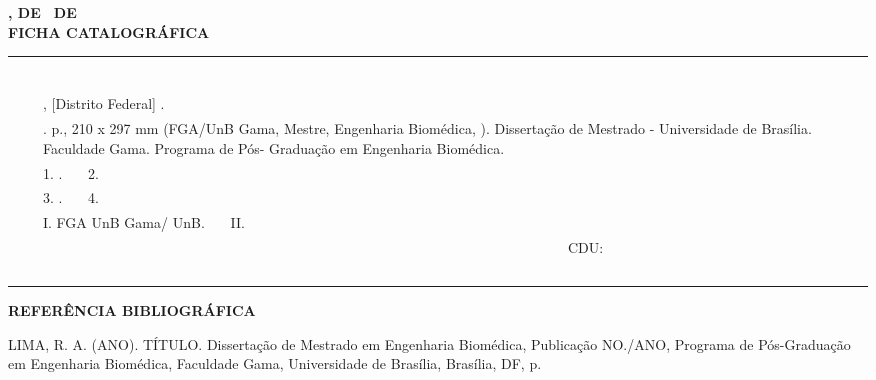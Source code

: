\begin{fichacatalografica}
\begin{flushleft}
    \textbf{\imprimirlocal, \imprimirdia DE \imprimirmes\, DE \imprimirdata} \\
       	    \vspace{0.25 in}
	\textbf{FICHA CATALOGRÁFICA}\\
	\begin{tabular}{c|p{}p{13.5cm}|}
	\multicolumn{3}{l}{~~~ } \\ \cline{2-3} 
	& & \\
	& & \imprimirautor \\
	& & \imprimirtitulo, [Distrito Federal] \imprimirdata.\\
	& & \imprimirpublicacao. \pageref{LastPage} p., 210 x 297 mm (FGA/UnB Gama, Mestre, Engenharia Biomédica, \imprimirdata).
	Dissertação de Mestrado - Universidade de Brasília. 
	Faculdade Gama. Programa de Pós- Graduação em Engenharia Biomédica.\\
	& & 1. \imprimirpalavrachaveum. ~~~2. \imprimirpalavrachavedois \\
	& & 3. \imprimirpalavrachavetres. ~~~4. \imprimirpalavrachavequatro \\
	& & I. FGA UnB Gama/ UnB. ~~~II.\imprimirtitulo \\
	& & ~~~~~~~~~~~~~~~~~~~~~~~~~~~~~~~~~~~~~~~~~~~~~~~~~~~~~~~~~~~~~~~~~~~~~~~~~~~CDU: \nomecdu \\ \cline{2-3}
	\multicolumn{3}{l}{~~~ } \\
	\end{tabular}
\end{flushleft}
	
\end{fichacatalografica}


\begin{flushleft}
\textbf{REFERÊNCIA BIBLIOGRÁFICA}\\
\end{flushleft}
LIMA, R. A. (ANO). TÍTULO. Dissertação de Mestrado em Engenharia
Biomédica, Publicação NO./ANO, Programa de Pós-Graduação em Engenharia
Biomédica, Faculdade Gama, Universidade de Brasília, Brasília, DF, \pageref{LastPage} p.

